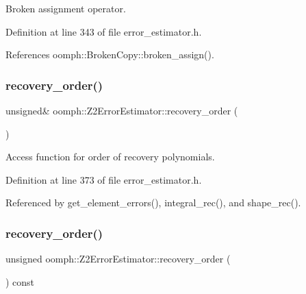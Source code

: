 Broken assignment operator. 



Definition at line 343 of file error\+\_\+estimator.\+h.



References oomph\+::\+Broken\+Copy\+::broken\+\_\+assign().

\mbox{\label{classoomph_1_1Z2ErrorEstimator_af7a3a28cfc05b291b438b80e87c7f5cc}} 
\subsubsection{\texorpdfstring{recovery\+\_\+order()}{recovery\_order()}\hspace{0.1cm}{\footnotesize\ttfamily [1/2]}}
{\footnotesize\ttfamily unsigned\& oomph\+::\+Z2\+Error\+Estimator\+::recovery\+\_\+order (\begin{DoxyParamCaption}{ }\end{DoxyParamCaption})\hspace{0.3cm}{\ttfamily [inline]}}



Access function for order of recovery polynomials. 



Definition at line 373 of file error\+\_\+estimator.\+h.



Referenced by get\+\_\+element\+\_\+errors(), integral\+\_\+rec(), and shape\+\_\+rec().

\mbox{\label{classoomph_1_1Z2ErrorEstimator_ad463b5c01e6bb5b9e4ec9b3a02f9fb4a}} 
\subsubsection{\texorpdfstring{recovery\+\_\+order()}{recovery\_order()}\hspace{0.1cm}{\footnotesize\ttfamily [2/2]}}
{\footnotesize\ttfamily unsigned oomph\+::\+Z2\+Error\+Estimator\+::recovery\+\_\+order (\begin{DoxyParamCaption}{ }\end{DoxyParamCaption}) const\hspace{0.3cm}{\ttfamily [inline]}}




